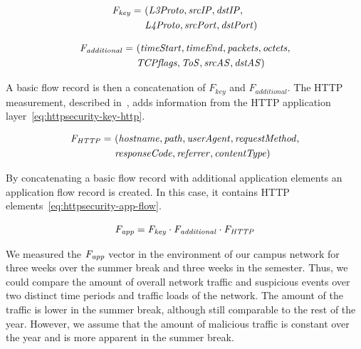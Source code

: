 \begin{equation} \label{eq:httpsecurity-flow-key}
    \begin{split}
        \mathit{F_{key}} =\ &\mathit{(L3Proto, srcIP, dstIP,} \\
        & \mathit{L4Proto, srcPort, dstPort)}
    \end{split}
\end{equation}

\begin{equation} \label{eq:httpsecurity-flow-additional}
    \begin{split}
        \mathit{F_{additional}} =\ &\mathit{(timeStart, timeEnd, packets, octets,} \\
        & \mathit{TCPflags, ToS, srcAS, dstAS )}
    \end{split}
\end{equation}

A basic flow record is then a concatenation of $F_{key}$ and $F_{additional}$. The HTTP measurement, described in~\cite{Velan-2013-Design}, adds information from the HTTP application layer~\eqref{eq:httpsecurity-key-http}. 

\begin{equation} \label{eq:httpsecurity-key-http}
    \begin{split}
        \mathit{F_{HTTP}} =\ &\mathit{(hostname, path, userAgent, requestMethod,} \\
        & \mathit{responseCode, referrer, contentType )}
    \end{split}
\end{equation}

By concatenating a basic flow record with additional application elements an application flow record is created. In this case, it contains HTTP elements~\eqref{eq:httpsecurity-app-flow}.

\begin{equation} \label{eq:httpsecurity-app-flow}
        \mathit{F_{app} = F_{key} \cdot F_{additional} \cdot F_{HTTP}}
\end{equation}

We measured the $\mathit{F_{app}}$ vector in the environment of our campus network for three weeks over the summer break and three weeks in the semester. Thus, we could compare the amount of overall network traffic and suspicious events over two distinct time periods and traffic loads of the network. The amount of the traffic is lower in the summer break, although still comparable to the rest of the year. However, we assume that the amount of malicious traffic is constant over the year and is more apparent in the summer break.


